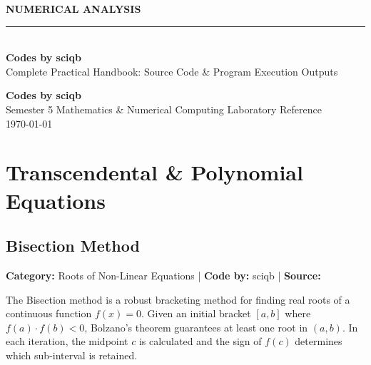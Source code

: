 \documentclass[10pt,a4paper]{report}
\begin{document}
\begin{titlepage}
\begin{center}
\vspace*{1.5cm}

{\fontsize{32pt}{38pt}\selectfont\bfseries\color{primary} NUMERICAL ANALYSIS}\\[1.0cm]

\textcolor{accentteal}{\rule{0.7\textwidth}{2.5pt}}\\[1.2cm]

{\fontsize{36pt}{44pt}\selectfont\bfseries\color{secondary} Codes by sciqb}\\[0.8cm]
{\large\color{pycomment} Complete Practical Handbook: Source Code \& Program Execution Outputs}\\[2.0cm]

\vfill

{\LARGE\textbf{\color{secondary}Codes by sciqb}}\\[0.3cm]
{\small Semester 5 Mathematics \& Numerical Computing Laboratory Reference}\\[0.3cm]
{\small\today}
\vspace*{1.5cm}

\end{center}
\end{titlepage}

\tableofcontents
\newpage
\chapter{Transcendental \& Polynomial Equations}


\section{Bisection Method}
\textbf{Category:} \textcolor{secondary}{Roots of Non-Linear Equations} \quad | \quad \textbf{Code by:} \textcolor{secondary}{sciqb} \quad | \quad \textbf{Source:} \texttt{}

The Bisection method is a robust bracketing method for finding real roots of a continuous function $f(x) = 0$. Given an initial bracket $[a, b]$ where $f(a) \cdot f(b) < 0$, Bolzano's theorem guarantees at least one root in $(a, b)$. In each iteration, the midpoint $c$ is calculated and the sign of $f(c)$ determines which sub-interval is retained.
\end{document}
